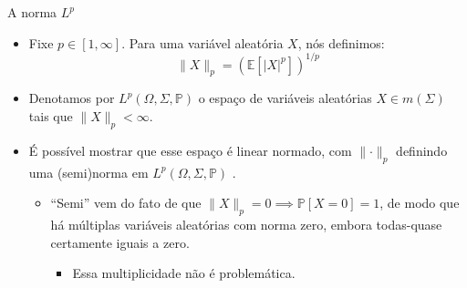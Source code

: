 \documentclass[11pt]{beamer}
\begin{document}
	\begin{frame}{A norma $L^p$}
	\begin{itemize}
		\item Fixe $p \in [1,\infty]$. Para uma variável aleatória $X$, nós definimos:
		$$\lVert X\rVert_p = (\mathbb{E}[|X|^p])^{1/p}$$
		\item Denotamos por $L^p(\Omega, \Sigma, \mathbb{P})$ o espaço de variáveis aleatórias $X \in m(\Sigma)$ tais que $\lVert X\rVert_p<\infty$.
		\item É possível mostrar que esse espaço é linear normado, com $\lVert \cdot \rVert_p$ definindo uma (semi)norma em $L^p(\Omega, \Sigma, \mathbb{P})$ .
		\begin{itemize}
			\item ``Semi'' vem do fato de que $\lVert X \rVert_p = 0 \implies \mathbb{P}[X=0]=1$, de modo que há múltiplas variáveis aleatórias com norma zero, embora todas-quase certamente iguais a zero. 
			\begin{itemize}
				\item Essa multiplicidade não é problemática.
			\end{itemize}
		\end{itemize}
	
	\end{itemize}
	\end{frame}
\end{document}
